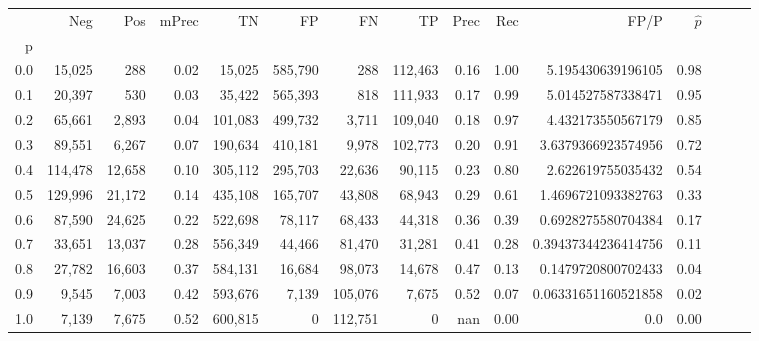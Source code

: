 \begin{tabular}{rrrrrrrrrrrrrrr}
\toprule
{} &      Neg &     Pos & mPrec &       TN &       FP &       FN &       TP &  Prec &   Rec &                 FP/P & $\hat{p}$ \\
p   &          &         &       &          &          &          &          &       &       &                      &           \\
\midrule
0.0 &   15,025 &     288 &  0.02 &   15,025 &  585,790 &      288 &  112,463 &  0.16 &  1.00 &    5.195430639196105 &      0.98 \\
0.1 &   20,397 &     530 &  0.03 &   35,422 &  565,393 &      818 &  111,933 &  0.17 &  0.99 &    5.014527587338471 &      0.95 \\
0.2 &   65,661 &   2,893 &  0.04 &  101,083 &  499,732 &    3,711 &  109,040 &  0.18 &  0.97 &    4.432173550567179 &      0.85 \\
0.3 &   89,551 &   6,267 &  0.07 &  190,634 &  410,181 &    9,978 &  102,773 &  0.20 &  0.91 &   3.6379366923574956 &      0.72 \\
0.4 &  114,478 &  12,658 &  0.10 &  305,112 &  295,703 &   22,636 &   90,115 &  0.23 &  0.80 &    2.622619755035432 &      0.54 \\
0.5 &  129,996 &  21,172 &  0.14 &  435,108 &  165,707 &   43,808 &   68,943 &  0.29 &  0.61 &   1.4696721093382763 &      0.33 \\
0.6 &   87,590 &  24,625 &  0.22 &  522,698 &   78,117 &   68,433 &   44,318 &  0.36 &  0.39 &   0.6928275580704384 &      0.17 \\
0.7 &   33,651 &  13,037 &  0.28 &  556,349 &   44,466 &   81,470 &   31,281 &  0.41 &  0.28 &  0.39437344236414756 &      0.11 \\
0.8 &   27,782 &  16,603 &  0.37 &  584,131 &   16,684 &   98,073 &   14,678 &  0.47 &  0.13 &   0.1479720800702433 &      0.04 \\
0.9 &    9,545 &   7,003 &  0.42 &  593,676 &    7,139 &  105,076 &    7,675 &  0.52 &  0.07 &  0.06331651160521858 &      0.02 \\
1.0 &    7,139 &   7,675 &  0.52 &  600,815 &        0 &  112,751 &        0 &   nan &  0.00 &                  0.0 &      0.00 \\
\bottomrule
\end{tabular}
